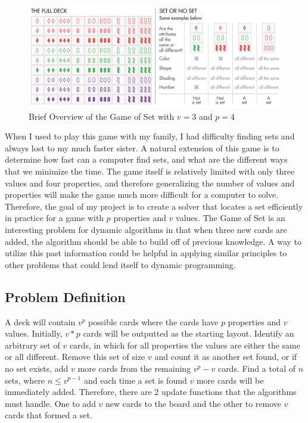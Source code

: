 \documentclass[pageno]{jpaper}
\begin{document}
\begin{figure}[htbb]
\centering
\begin{minipage}[b]{.75\linewidth}
\includegraphics[width=\linewidth]{SetOverview.png}
\caption{Brief Overview of the Game of Set with $v=3$ and $p=4$}
\label{fig:SetOverview}
\end{minipage}
\end{figure}

When I used to play this game with my family, I had difficulty finding sets and always lost to my much faster sister. A natural extension of this game is to determine how fast can a computer find sets, and what are the different ways that we minimize the time. The game itself is relatively limited with only three values and four properties, and therefore generalizing the number of values and properties will make the game much more difficult for a computer to solve. Therefore, the goal of my project is to create a solver that locates a set efficiently in practice for a game with $p$ properties and $v$ values. The Game of Set is an interesting problem for dynamic algorithms in that when three new cards are added, the algorithm should be able to build off of previous knowledge. A way to utilize this past information could be helpful in applying similar principles to other problems that could lend itself to dynamic programming. 


\subsection{Problem Definition}

A deck will contain $v^p$ possible cards where the cards have $p$ properties and $v$ values. Initially, $v*p$ cards will be outputted as the starting layout. Identify an arbitrary set of $v$ cards, in which for all properties the values are either the same or all different. Remove this set of size $v$ and count it as another set found, or if no set exists, add $v$ more cards from the remaining $v^p - v$ cards. Find a total of $n$ sets, where $n \leq v^{p-1}$ and each time a set is found $v$ more cards will be immediately added. Therefore, there are 2 update functions that the algorithms must handle. One to add $v$ new cards to the board and the other to remove $v$ cards that formed a set. 
\end{document}
